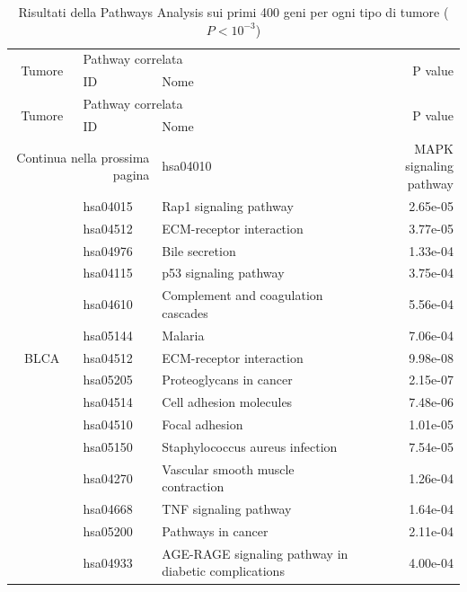 \begin{longtable}{cllr}
\caption{Risultati della Pathways Analysis sui primi 400 geni per ogni tipo di tumore ($P < 10^{-3}$)} \\
\toprule
\multirow{2}{*}{Tumore} & \multicolumn{2}{l}{Pathway correlata} & \multirow{2}{*}{P value} \\
& ID & Nome \\
\midrule
\endfirsthead
\toprule
\multirow{2}{*}{Tumore} & \multicolumn{2}{l}{Pathway correlata} & \multirow{2}{*}{P value} \\
& ID & Nome \\
\midrule
\endhead
\midrule
\multicolumn{2}{r}{Continua nella prossima pagina}
\endfoot
\bottomrule
\endlastfoot
ACC & hsa04010 & \textcolor{\clrnew}{MAPK signaling pathway} & 2.58e-07\\ 
    & hsa04015 & \textcolor{\clrnew}{Rap1 signaling pathway} & 2.65e-05 \\ 
     & hsa04512 & \textcolor{\clrnew}{ECM-receptor interaction} & 3.77e-05 \\ 
     & hsa04976 & \textcolor{\clrnew}{Bile secretion} & 1.33e-04 \\ 
     & hsa04115 & \textcolor{\clrnew}{p53 signaling pathway} & 3.75e-04 \\ 
     & hsa04610 & \textcolor{\clrnew}{Complement and coagulation cascades} & 5.56e-04 \\ 
     & hsa05144 & \textcolor{\clrnew}{Malaria} & 7.06e-04 \\ 
\midrule 
\rowcolor{\clrmatch}BLCA & hsa04512 & ECM-receptor interaction & 9.98e-08\\ 
 & hsa05205 & \textcolor{\clrnew}{Proteoglycans in cancer} & 2.15e-07 \\ 
 & hsa04514 & \textcolor{\clrnew}{Cell adhesion molecules} & 7.48e-06 \\ 
 \rowcolor{\clrmatch}& hsa04510 & Focal adhesion & 1.01e-05 \\ 
 & hsa05150 & \textcolor{\clrnew}{Staphylococcus aureus infection} & 7.54e-05 \\ 
 & hsa04270 & \textcolor{\clrnew}{Vascular smooth muscle contraction} & 1.26e-04 \\ 
 & hsa04668 & \textcolor{\clrnew}{TNF signaling pathway} & 1.64e-04 \\ 
 & hsa05200 & \textcolor{\clrnew}{Pathways in cancer} & 2.11e-04 \\ 
 & hsa04933 & \textcolor{\clrnew}{AGE-RAGE signaling pathway in diabetic complications} & 4.00e-04 \\ 

\end{longtable}
